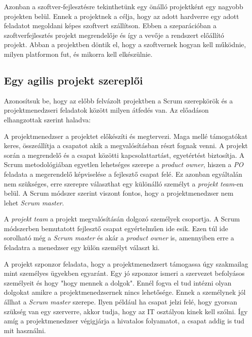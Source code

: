 \documentclass[a4paper,12pt,leqno, notitlepage]{article}%
\begin{document}
Azonban a szoftver-fejlesztésre tekinthetünk egy önálló projektként egy nagyobb projekten belül. Ennek a projektnek a célja, hogy az adott hardverre egy adott feladatot megoldani képes szoftvert szállítson. Ebben a szeparációban a szoftverfejlesztés projekt megrendelője és így a vevője a rendszert előállító projekt. Abban a projektben döntik el, hogy a szoftvernek hogyan kell működnie, milyen platformon fut, és mikorra kell elkészülnie. 

\subsection{Egy agilis projekt szereplői}
\label{sec:AProjektSzereploi}

Azonosítsuk be, hogy az előbb felvázolt projektben a Scrum szerepkörök és a projektmenedzseri feladatok között milyen átfedés van. Az előadáson elhangzottak szerint haladva:

A projektmenedzser a projektet előkészíti és megtervezi. Maga mellé támogatókat keres, összeállítja a csapatot akik a megvalósításban részt fognak venni. A projekt során a megrendelő és a csapat közötti kapcsolattartást, egyetértést biztosítja. A Scrum metodológiában egyetlen lehetséges szerepe a \emph{product owner}, hiszen a \emph{PO} feladata a megerendelő képviselése a fejlesztő csapat felé. Ez azonban egyáltalán nem szükséges, erre szerepre választhat egy különálló személyt a \emph{projekt team}-en belül. A Scrum módszer szerint viszont fontos, hogy a projektmenedzser nem lehet \emph{Scrum master}.

A \emph{projekt team} a projekt megvalósításán dolgozó személyek csoportja. A Scrum módszerben bemutatott fejlesztő csapat egyértelműen ide esik. Ezen túl ide sorolható még a \emph{Scrum master} és akár a \emph{product owner} is, amennyiben erre a feladatra a menedzser egy külön személyt választ ki.

A projekt szponzor feladata, hogy a projektmenedzsert támogassa úgy szakmailag mint személyes ügyekben egyaránt. Egy jó szponzor ismeri a szervezet befolyásos személyeit és hogy "hogy mennek a dolgok". Ennél fogva el tud intézni olyan dolgokat amikre a projektmenedzsernek nincs lehetősége. \cite{proj_szponzor} Ennek a személynek jól állhat a \emph{Scrum master} szerepe. Ilyen például ha csapat jelzi felé, hogy gyorsan szükség van egy szerverre, akkor tudja, hogy az IT osztályon kinek kell szólni. Így amíg a projektmenedzser végigjárja a hivatalos folyamatot, a csapat addig is tud mit használni.
\end{document}
